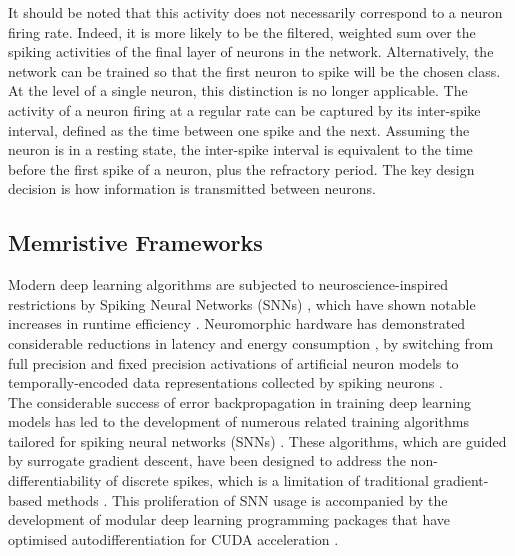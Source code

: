\noindent It should be noted that this activity does not necessarily correspond to a neuron firing rate. Indeed, it is more likely to be the filtered, weighted sum over the spiking activities of the final layer of neurons in the network. Alternatively, the network can be trained so that the first neuron to spike will be the chosen class.\\

\noindent At the level of a single neuron, this distinction is no longer applicable. The activity of a neuron firing at a regular rate can be captured by its inter-spike interval, defined as the time between one spike and the next. Assuming the neuron is in a resting state, the inter-spike interval is equivalent to the time before the first spike of a neuron, plus the refractory period. The key design decision is how information is transmitted between neurons.

\subsection[Memristive Frameworks]{Memristive Frameworks}

\noindent Modern deep learning algorithms are subjected to neuroscience-inspired restrictions by Spiking Neural Networks (SNNs) \cite{tavanaei2019deep}, which have shown notable increases in runtime efficiency \cite{wang2020supervised}. Neuromorphic hardware has demonstrated considerable reductions in latency and energy consumption \cite{wunderlich2019demonstrating}, by switching from full precision and fixed precision activations of artificial neuron models to temporally-encoded data representations collected by spiking neurons \cite{zhou2020towards}.\\

\noindent The considerable success of error backpropagation in training deep learning models has led to the development of numerous related training algorithms tailored for spiking neural networks (SNNs) \cite{werbos1990backpropagation}. These algorithms, which are guided by surrogate gradient descent, have been designed to address the non-differentiability of discrete spikes, which is a limitation of traditional gradient-based methods \cite{neftci2019surrogate}. This proliferation of SNN usage is accompanied by the development of modular deep learning programming packages \cite{hazan2018bindsnet} that have optimised autodifferentiation for CUDA acceleration \cite{pehle2021norse}. \\

